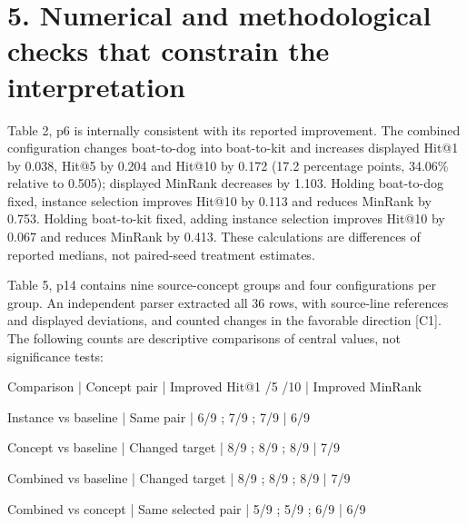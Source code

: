 \documentclass[10pt]{article}
\begin{document}
\section*{5. Numerical and methodological checks that constrain the interpretation}
Table 2, p6 is internally consistent with its reported improvement. The combined configuration changes boat-to-dog into boat-to-kit and increases displayed Hit@1 by 0.038, Hit@5 by 0.204 and Hit@10 by 0.172 (17.2 percentage points, 34.06\% relative to 0.505); displayed MinRank decreases by 1.103. Holding boat-to-dog fixed, instance selection improves Hit@10 by 0.113 and reduces MinRank by 0.753. Holding boat-to-kit fixed, adding instance selection improves Hit@10 by 0.067 and reduces MinRank by 0.413. These calculations are differences of reported medians, not paired-seed treatment estimates.\par
Table 5, p14 contains nine source-concept groups and four configurations per group. An independent parser extracted all 36 rows, with source-line references and displayed deviations, and counted changes in the favorable direction [C1]. The following counts are descriptive comparisons of central values, not significance tests:\par
Comparison | Concept pair | Improved Hit@1 /5 /10 | Improved MinRank\par
Instance vs baseline | Same pair | 6/9 ; 7/9 ; 7/9 | 6/9\par
Concept vs baseline | Changed target | 8/9 ; 8/9 ; 8/9 | 7/9\par
Combined vs baseline | Changed target | 8/9 ; 8/9 ; 8/9 | 7/9\par
Combined vs concept | Same selected pair | 5/9 ; 5/9 ; 6/9 | 6/9\par
\end{document}
